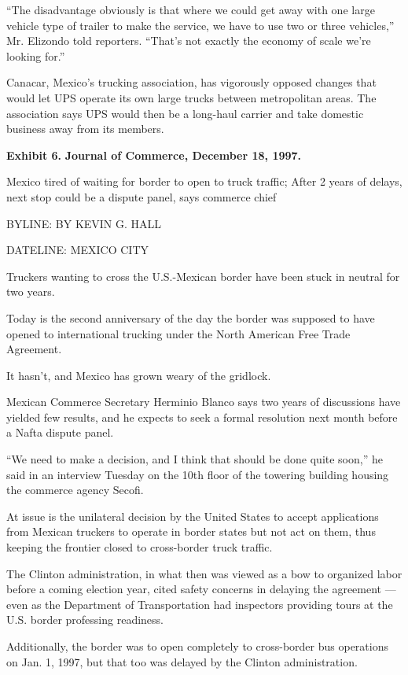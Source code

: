 \documentclass[letterpaper,12pt]{article}
\begin{document}
``The disadvantage obviously is that where we could get away with
one large vehicle type of trailer to make the service, we have to
use two or three vehicles,'' Mr. Elizondo told reporters. ``That's
not exactly the economy of scale we're looking for.''

Canacar, Mexico's trucking association, has vigorously opposed
changes that would let UPS operate its own large trucks between
metropolitan areas. The association says UPS would then be a
long-haul carrier and take domestic business away from its members.


\newpage
{\bf Exhibit 6.} {\bf Journal of Commerce, December 18, 1997.}

Mexico tired of waiting for border to open to truck traffic; After 2
years of delays, next stop could be a dispute panel, says commerce
chief

BYLINE: BY KEVIN G. HALL

DATELINE: MEXICO CITY

Truckers wanting to cross the U.S.-Mexican border have been stuck in
neutral for two years.

Today is the second anniversary of the day the border was supposed
to have opened to international trucking under the North American
Free Trade Agreement.

It hasn't, and Mexico has grown weary of the gridlock.

Mexican Commerce Secretary Herminio Blanco says two years of
discussions have yielded few results, and he expects to seek a
formal resolution next month before a Nafta dispute panel.

``We need to make a decision, and I think that should be done quite
soon,'' he said in an interview Tuesday on the 10th floor of the
towering building housing the commerce agency Secofi.

At issue is the unilateral decision by the United States to accept
applications from Mexican truckers to operate in border states but
not act on them, thus keeping the frontier closed to cross-border
truck traffic.

The Clinton administration, in what then was viewed as a bow to
organized labor before a coming election year, cited safety concerns
in delaying the agreement --- even as the Department of
Transportation had inspectors providing tours at the U.S. border
professing readiness.

Additionally, the border was to open completely to cross-border bus
operations on Jan. 1, 1997, but that too was delayed by the Clinton
administration.
\end{document}
